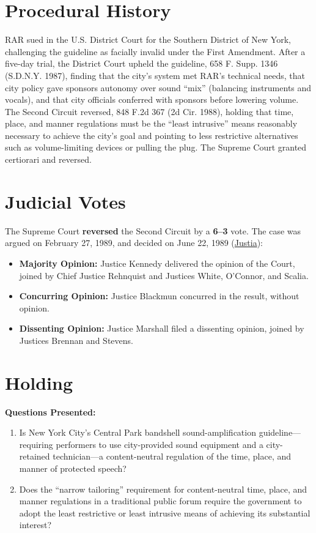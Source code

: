 \documentclass[12pt]{article}
\begin{document}
\section{Procedural History}
RAR sued in the U.S. District Court for the Southern District of New York, challenging the guideline as facially invalid under the First Amendment. After a five-day trial, the District Court upheld the guideline, 658 F. Supp. 1346 (S.D.N.Y. 1987), finding that the city's system met RAR's technical needs, that city policy gave sponsors autonomy over sound ``mix'' (balancing instruments and vocals), and that city officials conferred with sponsors before lowering volume. The Second Circuit reversed, 848 F.2d 367 (2d Cir. 1988), holding that time, place, and manner regulations must be the ``least intrusive'' means reasonably necessary to achieve the city's goal and pointing to less restrictive alternatives such as volume-limiting devices or pulling the plug. The Supreme Court granted certiorari and reversed.

\section{Judicial Votes}
The Supreme Court \textbf{reversed} the Second Circuit by a \textbf{6--3} vote. The case was argued on February 27, 1989, and decided on June 22, 1989 (\href{https://supreme.justia.com/cases/federal/us/491/781/}{Justia}):

\begin{itemize}
    \item \textbf{Majority Opinion:} Justice Kennedy delivered the opinion of the Court, joined by Chief Justice Rehnquist and Justices White, O'Connor, and Scalia.
    \item \textbf{Concurring Opinion:} Justice Blackmun concurred in the result, without opinion.
    \item \textbf{Dissenting Opinion:} Justice Marshall filed a dissenting opinion, joined by Justices Brennan and Stevens.
\end{itemize}

\section{Holding}
\textbf{Questions Presented:}

\begin{enumerate}
  \item Is New York City's Central Park bandshell sound-amplification guideline---requiring performers to use city-provided sound equipment and a city-retained technician---a content-neutral regulation of the time, place, and manner of protected speech?
  \item Does the ``narrow tailoring'' requirement for content-neutral time, place, and manner regulations in a traditional public forum require the government to adopt the least restrictive or least intrusive means of achieving its substantial interest?
\end{enumerate}
\end{document}
